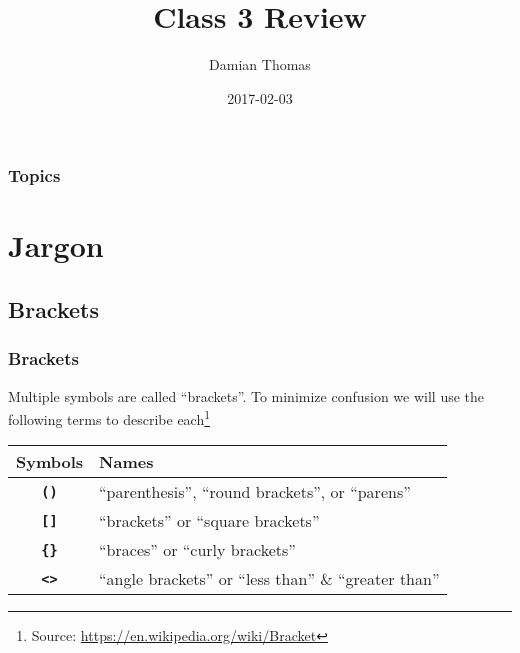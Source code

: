 \documentclass{beamer}
\title{Class 3 Review}
\author{Damian Thomas}
\date{2017-02-03}
\newcommand{\R}[1]{\texttt{#1}}
\begin{document}


\begin{frame}
\maketitle
\end{frame}



\begin{frame}
\frametitle{Topics}
\tableofcontents
\end{frame}



\section{Jargon}

\subsection{Brackets}
\begin{frame}
\frametitle{Brackets}

Multiple symbols are called ``brackets''. To minimize confusion we will use the following terms to describe each\footnote{Source: \url{https://en.wikipedia.org/wiki/Bracket}}

\begin{table}
\begin{tabular}{c|l}
Symbols & Names \\ \hline
\textbf{\R{()}} & ``parenthesis'', ``round brackets'', or ``parens'' \\
\textbf{\R{[]}} & ``brackets'' or ``square brackets'' \\
\textbf{\R{\{\}}} & ``braces'' or ``curly brackets'' \\
\textbf{\R{<>}} & ``angle brackets'' or ``less than'' \& ``greater than''\\
\end{tabular}
\end{table}


\end{frame}



\end{document}

